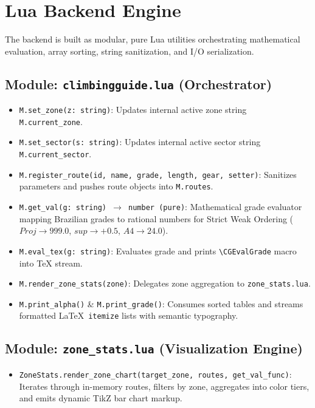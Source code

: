\clearpage
\section{Lua Backend Engine}

The backend is built as modular, pure Lua utilities orchestrating mathematical evaluation, array sorting, string sanitization, and I/O serialization.

\subsection{Module: \texttt{climbingguide.lua} (Orchestrator)}
{\small
\begin{itemize}
    \item \texttt{M.set\_zone(z: string)}: Updates internal active zone string \texttt{M.current\_zone}.
    \item \texttt{M.set\_sector(s: string)}: Updates internal active sector string \texttt{M.current\_sector}.
    \item \texttt{M.register\_route(id, name, grade, length, gear, setter)}: Sanitizes parameters and pushes route objects into \texttt{M.routes}.
    \item \texttt{M.get\_val(g: string) $\to$ number (pure)}: Mathematical grade evaluator mapping Brazilian grades to rational numbers for Strict Weak Ordering ($Proj \to 999.0$, $sup \to +0.5$, $A4 \to 24.0$).
    \item \texttt{M.eval\_tex(g: string)}: Evaluates grade and prints \texttt{\textbackslash CGEvalGrade} macro into TeX stream.
    \item \texttt{M.render\_zone\_stats(zone)}: Delegates zone aggregation to \texttt{zone\_stats.lua}.
    \item \texttt{M.print\_alpha()} \& \texttt{M.print\_grade()}: Consumes sorted tables and streams formatted \LaTeX\ \texttt{itemize} lists with semantic typography.
\end{itemize}
}

\subsection{Module: \texttt{zone\_stats.lua} (Visualization Engine)}
{\small
\begin{itemize}
    \item \texttt{ZoneStats.render\_zone\_chart(target\_zone, routes, get\_val\_func)}: Iterates through in-memory routes, filters by zone, aggregates into color tiers, and emits dynamic TikZ bar chart markup.
\end{itemize}
}

